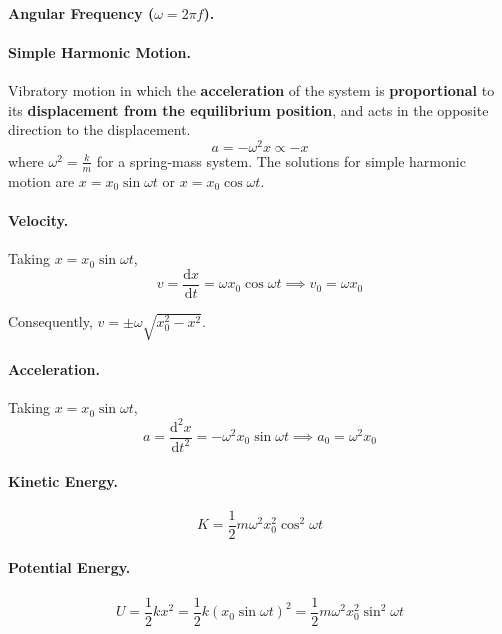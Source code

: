 \documentclass{article}
\begin{document}
\paragraph{Angular Frequency ($\omega = 2\pi f$).}

\paragraph{Simple Harmonic Motion.} Vibratory motion in which the \textbf{acceleration} of the system is \textbf{proportional} to its \textbf{displacement from the equilibrium position}, and acts in the opposite direction to the displacement. \begin{equation}
a = -\omega^2 x \propto -x
\end{equation} where $\omega^2 = \frac{k}{m}$ for a spring-mass system. The solutions for simple harmonic motion are $x = x_0\sin\omega t$ or $x = x_0\cos\omega t$.

\paragraph{Velocity.} Taking $x = x_0\sin\omega t$, \begin{equation}
v = \frac{\mathrm{d}x}{\mathrm{d}t} = \omega x_0\cos\omega t \implies v_0 = \omega x_0
\end{equation}

Consequently, $v = \pm\omega\sqrt{x_0^2 - x^2}$.

\paragraph{Acceleration.} Taking $x = x_0\sin\omega t$, \begin{equation}
a = \frac{\mathrm{d}^2x}{\mathrm{d}t^2} = -\omega^2 x_0\sin\omega t \implies a_0 = \omega^2 x_0
\end{equation}

\paragraph{Kinetic Energy.} \begin{equation}
K = \frac{1}{2}m\omega^2 x_0^2 \cos^2 \omega t
\end{equation}

\paragraph{Potential Energy.} \begin{equation}
U = \frac{1}{2}kx^2 = \frac{1}{2} k (x_0\sin\omega t)^2 = \frac{1}{2}m\omega^2 x_0^2 \sin^2\omega t
\end{equation}
\end{document}
